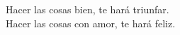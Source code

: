 \begin{dedication}
Hacer las cosas bien, te hará triunfar.\\
Hacer las cosas con amor, te hará feliz.
\end{dedication}
